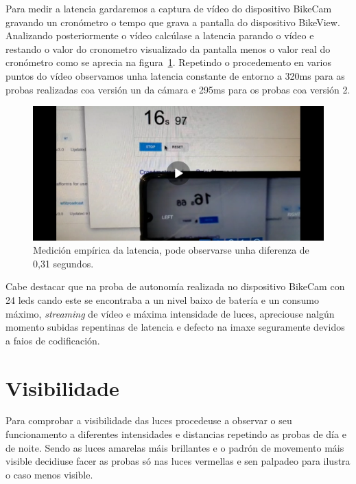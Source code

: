 Para medir a latencia gardaremos a captura de vídeo do dispositivo BikeCam gravando un cronómetro o tempo que grava a pantalla do dispositivo BikeView. Analizando posteriormente o vídeo calcúlase a latencia parando o vídeo e restando o valor do cronometro visualizado da pantalla menos o valor real do cronómetro como se aprecia na figura~\ref{fig:latencia}. Repetindo o procedemento en varios puntos do vídeo observamos unha latencia constante de entorno a 320ms para as probas realizadas coa versión un da cámara e 295ms para os probas coa versión 2.
\begin{figure}[tbp]
  \centering
  \includegraphics[scale=0.1]{imaxes/latencia.png}
  \caption{Medición empírica da latencia, pode observarse unha diferenza de 0,31 segundos.}
  \label{fig:latencia}
\end{figure}
Cabe destacar que na proba de autonomía realizada no dispositivo BikeCam con 24 leds cando este se encontraba a un nivel baixo de batería e un consumo máximo, \emph{streaming} de vídeo e máxima intensidade de luces, apreciouse nalgún momento subidas repentinas de latencia e defecto na imaxe seguramente devidos a faios de codificación.

\section{Visibilidade}
Para comprobar a visibilidade das luces procedeuse a observar o seu funcionamento a diferentes intensidades e distancias repetindo as probas de día e de noite. Sendo as luces amarelas máis brillantes e o padrón de movemento máis visible decidiuse facer as probas só nas luces vermellas e sen palpadeo para ilustra o caso menos visible.

